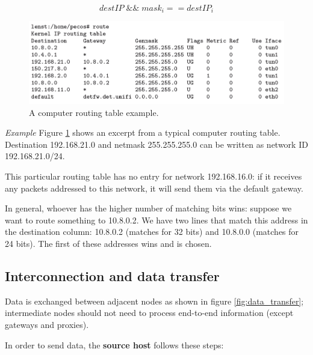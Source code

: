 \begin{equation}
\label{eq:routing}
    destIP\; \&\&\; mask_i == destIP_i
\end{equation}

\begin{figure}[H]
    \centering
    \includegraphics[scale=0.65]{img/routing_table.png}
    \decoRule
    \caption{A computer routing table example.}
    \label{fig:routing_table}
\end{figure}

\vspace{0.5em}

\emph{Example} Figure \ref{fig:routing_table} shows an excerpt from a typical computer routing table. Destination 192.168.21.0 and netmask 255.255.255.0 can be written as network ID 192.168.21.0/24.

This particular routing table has no entry for network 192.168.16.0: if it receives any packets addressed to this network, it will send them via the default gateway.

In general, whoever has the higher number of matching bits wins: suppose we want to route something to 10.8.0.2. We have two lines that match this address in the destination column: 10.8.0.2 (matches for 32 bits) and 10.8.0.0 (matches for 24 bits). The first of these addresses wins and is chosen.

\vspace{0.5em}


\subsection{Interconnection and data transfer}
Data is exchanged between adjacent nodes as shown in figure \ref{fig:data_transfer}; intermediate nodes should not need to process end-to-end information (except gateways and proxies).

In order to send data, the \textbf{source host} follows these steps:

